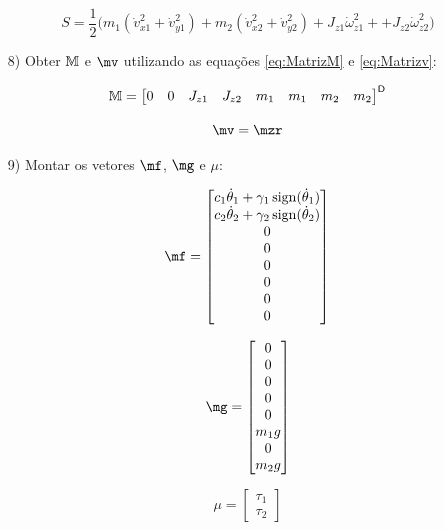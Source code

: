 \documentclass[a4paper,11pt,brazil,fleqn]{article}
\begin{document}
\begin{itemize}
\begin{equation}
S = \frac{1}{2} \Big( m_1 (\dot{v}_{x1}^2 + \dot{v}_{y1}^2) + m_2 (\dot{v}_{x2}^2 + \dot{v}_{y2}^2) + J_{z1} \dot{\omega}_{z1}^2 + + J_{z2} \dot{\omega}_{z2}^2 \Big)
\end{equation}

\item[8)] Obter $\mathbb{M}$ e $\mv$ utilizando as equa\c{c}\~oes \eqref{eq:MatrizM} e \eqref{eq:Matrizv}:

\begin{equation}
\mathbb{M} = \begin{bmatrix}
0 & 0 & J_{z1} & J_{z2} & m_1 & m_1 & m_2 & m_2
\end{bmatrix}^{\mathsf{D}}
\end{equation}

\begin{equation}
\mv = \mzr
\end{equation}

\item[9)] Montar os vetores $\mf$, $\mg$ e $\mu$:

\begin{equation}
\mf =
\begin{bmatrix}
c_1 \dot{\theta}_1 + \gamma_1 \sign (\dot{\theta}_1) \\
c_2 \dot{\theta}_2 + \gamma_2 \sign (\dot{\theta}_2) \\
0 \\
0 \\
0 \\
0 \\
0 \\
0 \\
\end{bmatrix}
\end{equation}

\begin{equation}
\mg =
\begin{bmatrix}
0 \\
0 \\
0 \\
0 \\
0 \\
m_1 g \\
0 \\
m_2 g
\end{bmatrix}
\end{equation}

\begin{equation}
\mu =
\begin{bmatrix}
\tau_1 \\
\tau_2
\end{bmatrix}
\end{equation}

\end{itemize}
\end{document}
